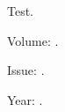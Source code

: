 \documentclass{journal}
\begin{document}
Test.

Volume: \JournalVolume.

Issue: \JournalIssue.

Year: \JournalYear.
\end{document}
